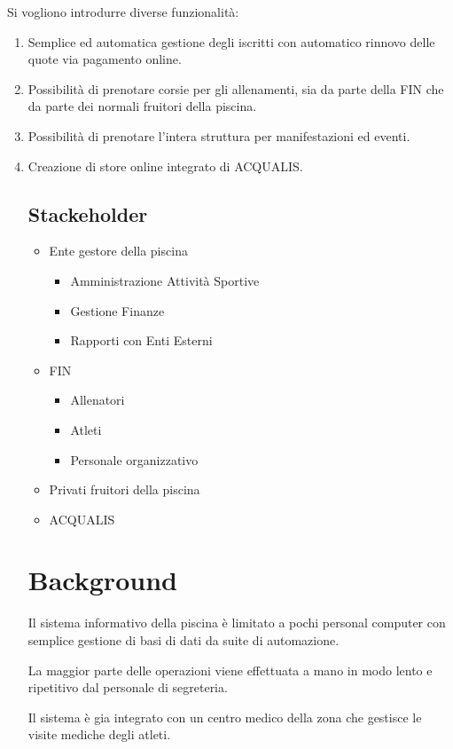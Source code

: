 \documentclass[11pt]{article} %
\begin{document}
Si vogliono introdurre diverse funzionalità:
\begin{enumerate}
	\item Semplice ed automatica gestione degli iscritti con automatico rinnovo delle quote via pagamento online. 
	\item Possibilità di prenotare corsie per gli allenamenti, sia da parte della FIN che da parte dei normali fruitori della piscina.
	\item Possibilità di prenotare l'intera struttura per manifestazioni ed eventi.
	\item Creazione di store online integrato di ACQUALIS.

\subsection*{Stackeholder}

\begin{itemize}
	\item Ente gestore della piscina
	\begin{itemize}
		\item Amministrazione Attività Sportive
		\item Gestione Finanze
		\item Rapporti con Enti Esterni
	\end{itemize}
	\item FIN
	\begin{itemize}
		\item Allenatori
		\item Atleti
		\item Personale organizzativo
	\end{itemize}
	\item Privati fruitori della piscina
	\item ACQUALIS
\end{itemize}


\section{Background}

Il sistema informativo della piscina è limitato a pochi personal computer con semplice gestione di basi di dati da suite di automazione.

La maggior parte delle operazioni viene effettuata a mano in modo lento e ripetitivo dal personale di segreteria.


Il sistema è gia integrato con un centro medico della zona che gestisce le visite mediche degli atleti.


\end{enumerate}
\end{document}
